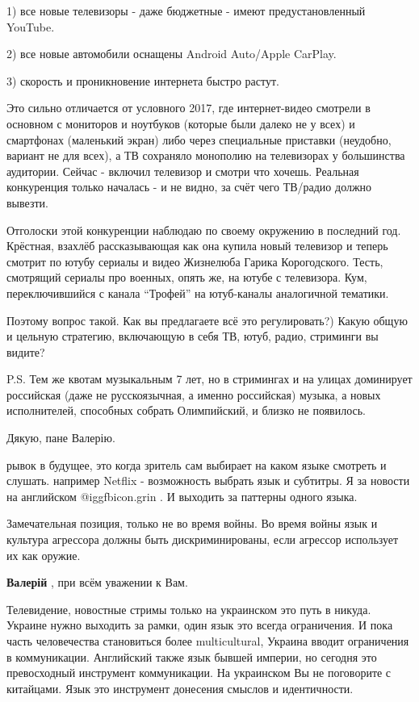 \begin{itemize}
\begin{itemize}
1) все новые телевизоры - даже бюджетные - имеют предустановленный YouTube.

2) все новые автомобили оснащены Android Auto/Apple CarPlay.

3) скорость и проникновение интернета быстро растут.

Это сильно отличается от условного 2017, где интернет-видео смотрели в основном
с мониторов и ноутбуков (которые были далеко не у всех) и смартфонах (маленький
экран) либо через специальные приставки (неудобно, вариант не для всех), а ТВ
сохраняло монополию на телевизорах у большинства аудитории. Сейчас - включил
телевизор и смотри что хочешь. Реальная конкуренция только началась - и не
видно, за счёт чего ТВ/радио должно вывезти.

Отголоски этой конкуренции наблюдаю по своему окружению в последний год.
Крёстная, взахлёб рассказывающая как она купила новый телевизор и теперь
смотрит по ютубу сериалы и видео Жизнелюба Гарика Корогодского. Тесть,
смотрящий сериалы про военных, опять же, на ютубе с телевизора. Кум,
переключившийся с канала \enquote{Трофей} на ютуб-каналы аналогичной тематики.

Поэтому вопрос такой. Как вы предлагаете всё это регулировать?) Какую общую и
цельную стратегию, включающую в себя ТВ, ютуб, радио, стриминги вы видите?

P.S. Тем же квотам музыкальным 7 лет, но в стримингах и на улицах доминирует
российская (даже не русскоязычная, а именно российская) музыка, а новых
исполнителей, способных собрать Олимпийский, и близко не появилось.

\end{itemize} %

Дякую, пане Валерію.


рывок в будущее, это когда зритель сам выбирает на каком языке смотреть и
слушать. например Netflix - возможность выбрать язык и субтитры. Я за новости
на английском  @igg{fbicon.grin} . И выходить за паттерны одного языка.

\begin{itemize} %

Замечательная позиция, только не во время войны. Во время войны язык и культура
агрессора должны быть дискриминированы, если агрессор использует их как оружие.

\textbf{Валерій} , при всём уважении к Вам.

Телевидение, новостные стримы только на украинском это путь в никуда. Украине
нужно выходить за рамки, один язык это всегда ограничения. И пока часть
человечества становиться более multicultural, Украина вводит ограничения в
коммуникации. Английский также язык бывшей империи, но сегодня это превосходный
инструмент коммуникации. На украинском Вы не поговорите с китайцами. Язык это
инструмент донесения смыслов и идентичности.


\end{itemize}
\end{itemize}
